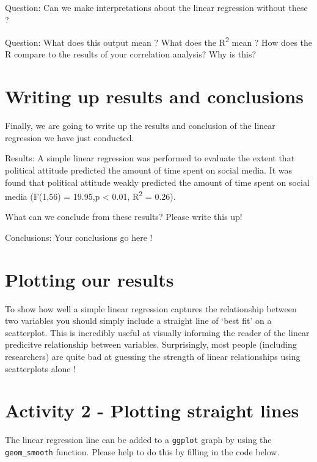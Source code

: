 \documentclass[
]{book}
\begin{document}
Question: Can we make interpretations about the linear regression without these ?

Question: What does this output mean ? What does the R\textsuperscript{2} mean ? How does the R compare to the results of your correlation analysis? Why is this?

\section{Writing up results and conclusions}\label{writing-up-results-and-conclusions-4}

Finally, we are going to write up the results and conclusion of the linear regression we have just conducted.

Results: A simple linear regression was performed to evaluate the extent that political attitude predicted the amount of time spent on social media. It was found that political attitude weakly predicted the amount of time spent on social media (F(1,56) = 19.95,p \textless{} 0.01, R\textsuperscript{2} = 0.26).

What can we conclude from these results? Please write this up!

Conclusions: Your conclusions go here !

\section{Plotting our results}\label{plotting-our-results-1}

To show how well a simple linear regression captures the relationship between two variables you should simply include a straight line of `best fit' on a scatterplot. This is incredibly useful at visually informing the reader of the linear predicitve relationship between variables. Surprisingly, most people (including researchers) are quite bad at guessing the strength of linear relationships using scatterplots alone !

\section{Activity 2 - Plotting straight lines}\label{activity-2---plotting-straight-lines}

The linear regression line can be added to a \texttt{ggplot} graph by using the \texttt{geom\_smooth} function. Please help to do this by filling in the code below.
\end{document}
